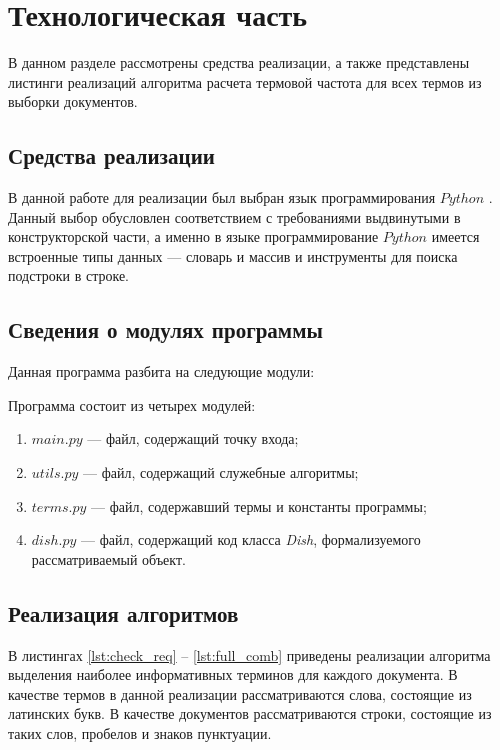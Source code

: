 \chapter{Технологическая часть}

В данном разделе рассмотрены средства реализации, а также представлены листинги реализаций алгоритма расчета термовой частота для всех термов из выборки документов.

\section{Средства реализации}

В данной работе для реализации был выбран язык программирования $Python$ \cite{pythonlang}. 
Данный выбор обусловлен соответствием с требованиями выдвинутыми в конструкторской части, а именно в языке программирование $Python$ имеется встроенные типы данных --- словарь и массив и инструменты для поиска подстроки в строке.

\section{Сведения о модулях программы}

Данная программа разбита на следующие модули:

Программа состоит из четырех модулей:
\begin{enumerate}[label=\arabic*)]
	\item $main.py$ --- файл, содержащий точку входа;
	\item $utils.py$ --- файл, содержащий служебные алгоритмы;
	\item $terms.py$ --- файл, содержавший термы и константы программы;
	\item $dish.py$ --- файл, содержащий код класса \textit{Dish}, формализуемого рассматриваемый объект. 
\end{enumerate}

\section{Реализация алгоритмов}

В листингах \ref{lst:check_req} -- \ref{lst:full_comb} приведены реализации алгоритма выделения наиболее информативных терминов для каждого документа. 
В качестве термов в данной реализации рассматриваются слова, состоящие из латинских букв. В качестве документов рассматриваются строки, состоящие из таких слов, пробелов и знаков пунктуации.

